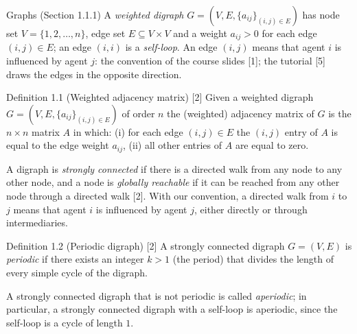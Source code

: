 

\begin{frame}[label=bk-graphs]{Graphs (Section 1.1.1)}
  \scriptsize
  A \emph{weighted digraph} $G = (V, E, \{a_{ij}\}_{(i,j) \in E})$ has node set
  $V = \{1, 2, \dots, n\}$, edge set $E \subseteq V \times V$ and a weight $a_{ij} > 0$ for
  each edge $(i,j) \in E$; an edge $(i,i)$ is a \emph{self-loop}. An edge $(i,j)$ means
  that agent $i$ is influenced by agent $j$: the convention of the course slides [1]; the
  tutorial [5] draws the edges in the opposite direction.
  \begin{block}{Definition 1.1 (Weighted adjacency matrix) [2]}
    Given a weighted digraph $G = (V, E, \{a_{ij}\}_{(i,j) \in E})$ of order $n$ the
    (weighted) adjacency matrix of $G$ is the $n \times n$ matrix $A$ in which:
    (i) for each edge $(i,j) \in E$ the $(i,j)$ entry of $A$ is equal to the edge weight
    $a_{ij}$, (ii) all other entries of $A$ are equal to zero.
  \end{block}
  A digraph is \emph{strongly connected} if there is a directed walk from any node to any
  other node, and a node is \emph{globally reachable} if it can be reached from any other
  node through a directed walk [2]. With our convention, a directed walk from $i$ to $j$
  means that agent $i$ is influenced by agent $j$, either directly or through
  intermediaries.
  \begin{block}{Definition 1.2 (Periodic digraph) [2]}
    A strongly connected digraph $G = (V, E)$ is \emph{periodic} if there exists an
    integer $k > 1$ (the period) that divides the length of every simple cycle of the
    digraph.
  \end{block}
  A strongly connected digraph that is not periodic is called \emph{aperiodic}; in
  particular, a strongly connected digraph with a self-loop is aperiodic, since the
  self-loop is a cycle of length $1$.
\end{frame}

